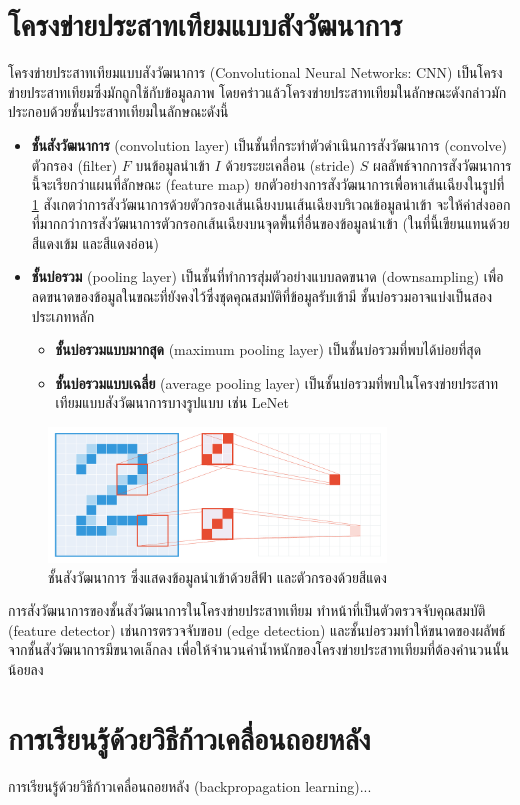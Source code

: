 \documentclass{cpereport}
\begin{document}
\section{โครงข่ายประสาทเทียมแบบสังวัฒนาการ}

โครงข่ายประสาทเทียมแบบสังวัฒนาการ (Convolutional Neural Networks: CNN) \cite{lecun-1998} เป็นโครงข่ายประสาทเทียมซึ่งมักถูกใช้กับข้อมูลภาพ \cite{Krizhevsky-2012} โดยคร่าวแล้วโครงข่ายประสาทเทียมในลักษณะดังกล่าวมักประกอบด้วยชั้นประสาทเทียมในลักษณะดังนี้

\begin{itemize}
    \item \textbf{ชั้นสังวัฒนาการ} (convolution layer) เป็นชั้นที่กระทำตัวดำเนินการสังวัฒนาการ (convolve) ตัวกรอง (filter) $F$ บนข้อมูลนำเข้า $I$ ด้วยระยะเคลื่อน (stride) $S$ ผลลัพธ์จากการสังวัฒนาการนี้จะเรียกว่าแผนที่ลักษณะ (feature map) ยกตัวอย่างการสังวัฒนาการเพื่อหาเส้นเฉียงในรูปที่ \ref{conv-figure} สังเกตว่าการสังวัฒนาการด้วยตัวกรองเส้นเฉียงบนเส้นเฉียงบริเวณข้อมูลนำเข้า จะให้ค่าส่งออกที่มากกว่าการสังวัฒนาการตัวกรอกเส้นเฉียงบนจุดพื้นที่อื่นของข้อมูลนำเข้า (ในที่นี้เขียนแทนด้วยสีแดงเข้ม และสีแดงอ่อน)
    \item \textbf{ชั้นบ่อรวม} (pooling layer)
    เป็นชั้นที่ทำการสุ่มตัวอย่างแบบลดขนาด (downsampling) เพื่อลดขนาดของข้อมูลในขณะที่ยังคงไว้ซึ่งชุดคุณสมบัติที่ข้อมูลรับเข้ามี ชั้นบ่อรวมอาจแบ่งเป็นสองประเภทหลัก
    \begin{itemize} 
        \item \textbf{ชั้นบ่อรวมแบบมากสุด} (maximum pooling layer) เป็นชั้นบ่อรวมที่พบได้บ่อยที่สุด
        \item \textbf{ชั้นบ่อรวมแบบเฉลี่ย} (average pooling layer) เป็นชั้นบ่อรวมที่พบในโครงข่ายประสาทเทียมแบบสังวัฒนาการบางรูปแบบ เช่น LeNet
    \end{itemize}
\end{itemize}

\begin{figure}
    \centering
    \includegraphics[width=0.8\textwidth]{images/convolution.pdf}
    \caption{ชั้นสังวัฒนาการ ซึ่งแสดงข้อมูลนำเข้าด้วยสีฟ้า และตัวกรองด้วยสีแดง}
    \label{conv-figure}
\end{figure}
การสังวัฒนาการของชั้นสังวัฒนาการในโครงข่ายประสาทเทียม ทำหน้าที่เป็นตัวตรวจจับคุณสมบัติ (feature detector) เช่นการตรวจจับขอบ (edge detection) และชั้นบ่อรวมทำให้ขนาดของผลัพธ์จากชั้นสังวัฒนาการมีขนาดเล็กลง เพื่อให้จำนวนค่าน้ำหนักของโครงข่ายประสาทเทียมที่ต้องคำนวนนั้นน้อยลง

\section{การเรียนรู้ด้วยวิธีก้าวเคลื่อนถอยหลัง}

การเรียนรู้ด้วยวิธีก้าวเคลื่อนถอยหลัง (backpropagation learning)...

 

\end{document}
